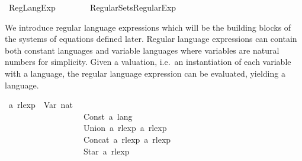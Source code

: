 %
\begin{isabellebody}%
%
%
\isadelimdocument
%
\endisadelimdocument
%
\isatagdocument
%
\isamarkuptrue%
%
\endisatagdocument
{\isafolddocument}%
%
\isadelimdocument
%
\endisadelimdocument
%
\isadelimtheory
%
\endisadelimtheory
%
\isatagtheory
{}\isamarkupfalse%
\ Reg{\isacharunderscore}{\kern0pt}Lang{\isacharunderscore}{\kern0pt}Exp\isanewline
\ \ \ \isanewline
\ \ \ \ {\isachardoublequoteopen}Regular{\isacharminus}{\kern0pt}Sets{\isachardot}{\kern0pt}Regular{\isacharunderscore}{\kern0pt}Exp{\isachardoublequoteclose}\isanewline
{}%
\endisatagtheory
{\isafoldtheory}%
%
\isadelimtheory
%
\endisadelimtheory
%
\isadelimdocument
%
\endisadelimdocument
%
\isatagdocument
%
\isamarkuptrue%
%
\endisatagdocument
{\isafolddocument}%
%
\isadelimdocument
%
\endisadelimdocument
%
\begin{isamarkuptext}%
We introduce regular language expressions which will be the building blocks of the systems of
equations defined later. Regular language expressions can contain both constant languages and
variable languages where variables are natural numbers for simplicity. Given a valuation, i.e.\ an
instantiation of each variable with a language, the regular language expression can be evaluated,
yielding a language.%
\end{isamarkuptext}\isamarkuptrue%
\isamarkupfalse%
\ {\isacharprime}{\kern0pt}a\ rlexp\ {\isacharequal}{\kern0pt}\ Var\ nat\ \ \ \ \ \ \ \ \ \ \ \ \ \ \ \ \ \ \ \ \ \ \ \ \ \ \isanewline
\ \ \ \ \ \ \ \ \ \ \ \ \ \ \ \ \ \ {\isacharbar}{\kern0pt}\ Const\ {\isachardoublequoteopen}{\isacharprime}{\kern0pt}a\ lang{\isachardoublequoteclose}\ \ \ \ \ \ \ \ \ \ \ \ \ \ \ \ \ \ \isanewline
\ \ \ \ \ \ \ \ \ \ \ \ \ \ \ \ \ \ {\isacharbar}{\kern0pt}\ Union\ {\isachardoublequoteopen}{\isacharprime}{\kern0pt}a\ rlexp{\isachardoublequoteclose}\ {\isachardoublequoteopen}{\isacharprime}{\kern0pt}a\ rlexp{\isachardoublequoteclose}\isanewline
\ \ \ \ \ \ \ \ \ \ \ \ \ \ \ \ \ \ {\isacharbar}{\kern0pt}\ Concat\ {\isachardoublequoteopen}{\isacharprime}{\kern0pt}a\ rlexp{\isachardoublequoteclose}\ {\isachardoublequoteopen}{\isacharprime}{\kern0pt}a\ rlexp{\isachardoublequoteclose}\ \ \ \ \ \isanewline
\ \ \ \ \ \ \ \ \ \ \ \ \ \ \ \ \ \ {\isacharbar}{\kern0pt}\ Star\ {\isachardoublequoteopen}{\isacharprime}{\kern0pt}a\ rlexp{\isachardoublequoteclose}\ \ \ \ \ \ \ \ \ \ \ \ \ \ \ \ \ \ \isanewline

\end{isabellebody}
